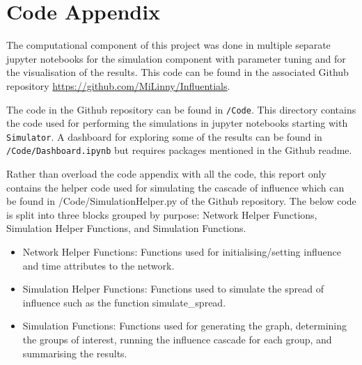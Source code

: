 \documentclass[10pt, oneside, reqno]{amsart}
\theoremstyle{plain}%
\theoremstyle{definition}
\theoremstyle{remark}
\begin{document}
\newpage



\section*{Code Appendix}

The computational component of this project was done in multiple separate jupyter notebooks for the simulation component with parameter tuning and for the visualisation of the results.
This code can be found in the associated Github repository \url{https://github.com/MiLinny/Influentials}.

The code in the Github repository can be found in \texttt{/Code}.
This directory contains the code used for performing the simulations in jupyter notebooks starting with \texttt{Simulator}.
A dashboard for exploring some of the results can be found in \texttt{/Code/Dashboard.ipynb} but requires packages mentioned in the Github readme. 

Rather than overload the code appendix with all the code, this report only contains the helper code used for simulating the cascade of influence which can be found in /Code/SimulationHelper.py of the Github repository.
The below code is split into three blocks grouped by purpose: Network Helper Functions, Simulation Helper Functions, and Simulation Functions.

\begin{itemize}
    \item Network Helper Functions: Functions used for initialising/setting influence and time attributes to the network.
    \item Simulation Helper Functions: Functions used to simulate the spread of influence such as the function simulate\_spread.
    \item Simulation Functions: Functions used for generating the graph, determining the groups of interest, running the influence cascade for each group, and summarising the results.
\end{itemize}
\end{document}
